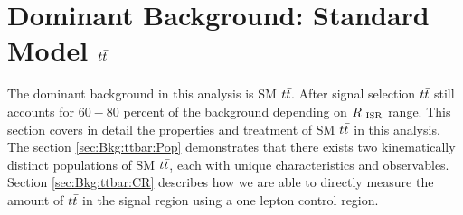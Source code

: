 \section{Dominant Background: Standard Model $t\bar{t}$}
\label{sec:Bkg:ttbar}

\indent The dominant background in this analysis is SM $t\bar{t}$.  After signal selection $t\bar{t}$ still accounts for $60-80$ percent of the background depending on $R_{~\mathrm{ISR}}$ range.  This section covers in detail the properties and treatment of SM $t\bar{t}$ in this analysis.  The section \ref{sec:Bkg:ttbar:Pop} demonstrates that there exists two kinematically distinct populations of SM $t\bar{t}$, each with unique characteristics and observables.  Section \ref{sec:Bkg:ttbar:CR} describes how we are able to directly measure the amount of $t\bar{t}$ in the signal region using a one lepton control region.  \\





